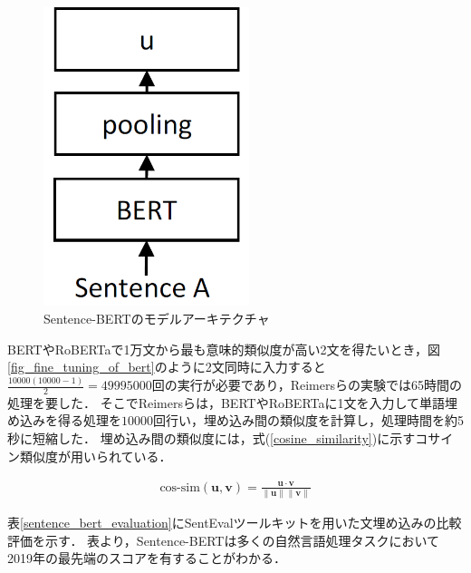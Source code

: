 \documentclass[12pt,a4j]{jreport}
\begin{document}


\begin{figure}[H]
	\centering
	\includegraphics[keepaspectratio, width=60mm]{img/sentence-bert.png}
	\caption{Sentence-BERTのモデルアーキテクチャ\protect\footnotemark[8]}
	\label{fig_sentence_bert}
\end{figure}

BERTやRoBERTaで1万文から最も意味的類似度が高い2文を得たいとき，図\ref{fig_fine_tuning_of_bert}のように2文同時に入力すると$\frac{10000(10000-1)}{2}=49995000$回の実行が必要であり，Reimersらの実験では65時間の処理を要した．
そこでReimersらは，BERTやRoBERTaに1文を入力して単語埋め込みを得る処理を$10000$回行い，埋め込み間の類似度を計算し，処理時間を約5秒に短縮した．
埋め込み間の類似度には，式(\ref{cosine_similarity})に示すコサイン類似度が用いられている．

\begin{align}
  \text{cos-sim}\left(\bm{u}, \bm{v}\right) = \frac{\bm{u} \cdot \bm{v}}{\|\bm{u}\|\|\bm{v}\|}
  \label{cosine_similarity}
\end{align}

表\ref{sentence_bert_evaluation}にSentEvalツールキットを用いた文埋め込みの比較評価を示す．
表より，Sentence-BERTは多くの自然言語処理タスクにおいて2019年の最先端のスコアを有することがわかる．
\end{document}

